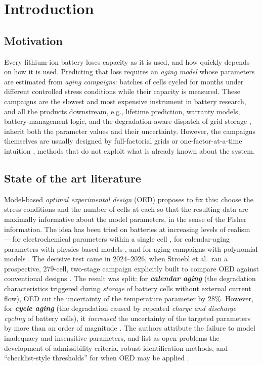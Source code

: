 \documentclass[11pt,letterpaper]{article}
\newcommand{\dash}{\,---\,}
\begin{document}
\section{Introduction}

\subsection{Motivation}
Every lithium-ion battery loses capacity as it is used, and how quickly depends on how it is used. Predicting that loss requires an \emph{aging model} whose parameters are estimated from \emph{aging campaigns}: batches of cells cycled for months under different controlled stress conditions while their capacity is measured. These campaigns are the slowest and most expensive instrument in battery research, and all the products downstream, e.g., lifetime prediction, warranty models, battery-management logic, and the degradation-aware dispatch of grid storage \cite{xu2018,shi2017}, inherit both the parameter values and their uncertainty. However, the campaigns themselves are usually designed by full-factorial grids or one-factor-at-a-time intuition \cite{stroebl2026}, methods that do not exploit what is already known about the system.

\subsection{State of the art literature}
Model-based \emph{optimal experimental design} (OED) proposes to fix this: choose the stress conditions and the number of cells at each so that the resulting data are maximally informative about the model parameters, in the sense of the Fisher information. The idea has been tried on batteries at increasing levels of realism\dash for electrochemical parameters within a single cell \cite{park2018,pozzi2019,ozkan2025,mikesell2025}, for calendar-aging parameters with physics-based models \cite{movahedi2023}, and for aging campaigns with polynomial models \cite{forman2012,mathieu2017,benmarzouk2016}. The decisive test came in 2024--2026, when Stroebl et al.\ ran a prospective, 279-cell, two-stage campaign explicitly built to compare OED against conventional designs \cite{stroebl2024}. The result was split: for \textbf{\textit{calendar aging}} (the degradation characteristics triggered during \textit{storage} of battery cells without external current flow), OED cut the uncertainty of the temperature parameter by 28\%. However, for \textbf{\textit{cycle aging}} (the degradation caused by repeated \textit{charge and discharge cycling} of battery cells), it \emph{increased} the uncertainty of the targeted parameters by more than an order of magnitude \cite{stroebl2026}. The authors attribute the failure to model inadequacy and insensitive parameters, and list as open problems the development of admissibility criteria, robust identification methods, and ``checklist-style thresholds'' for when OED may be applied \cite{stroebl2026}.
\end{document}
